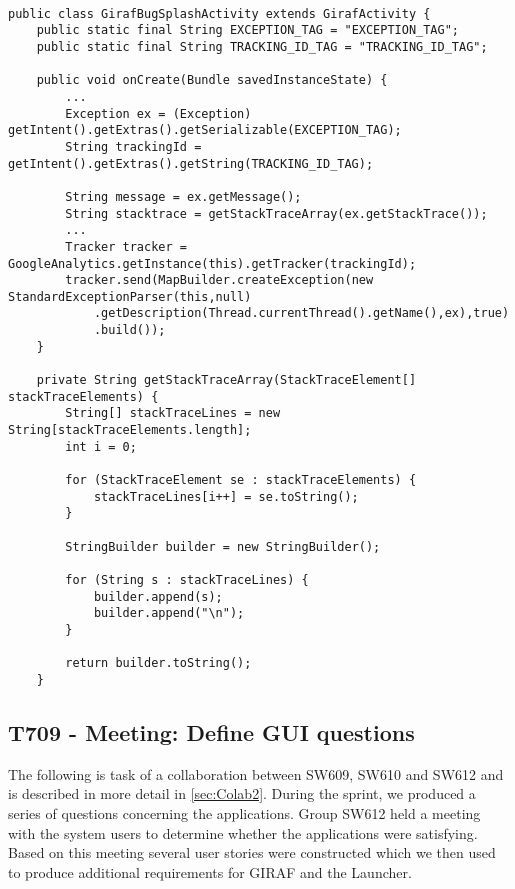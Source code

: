 \begin{minipage}[H]{\linewidth}
\begin{lstlisting}[caption = Our approach to outputting the stack trace, label = BugOurSol]

public class GirafBugSplashActivity extends GirafActivity {
	public static final String EXCEPTION_TAG = "EXCEPTION_TAG";
    public static final String TRACKING_ID_TAG = "TRACKING_ID_TAG";
    
	public void onCreate(Bundle savedInstanceState) {
		...
		Exception ex = (Exception) getIntent().getExtras().getSerializable(EXCEPTION_TAG); 
		String trackingId = getIntent().getExtras().getString(TRACKING_ID_TAG);
		
		String message = ex.getMessage();
        String stacktrace = getStackTraceArray(ex.getStackTrace());
        ...
        Tracker tracker = GoogleAnalytics.getInstance(this).getTracker(trackingId);
        tracker.send(MapBuilder.createException(new StandardExceptionParser(this,null)
            .getDescription(Thread.currentThread().getName(),ex),true)
            .build());
    }

	private String getStackTraceArray(StackTraceElement[] stackTraceElements) {
        String[] stackTraceLines = new String[stackTraceElements.length];
        int i = 0;
        
        for (StackTraceElement se : stackTraceElements) {
            stackTraceLines[i++] = se.toString();
        }
        
        StringBuilder builder = new StringBuilder();
        
        for (String s : stackTraceLines) {
            builder.append(s);
            builder.append("\n");
        }
        
        return builder.toString();
    }
\end{lstlisting}
\end{minipage}

\subsection{T709 - Meeting: Define GUI questions}
The following is task of a collaboration between SW609, SW610 and SW612 and is
described in more detail in \autoref{sec:Colab2}. During the sprint, we
produced a series of questions concerning the applications. Group SW612
held a meeting with the system users to determine whether the applications were
satisfying. Based on this meeting several user stories were constructed which
we then used to produce additional requirements for GIRAF and the Launcher.

